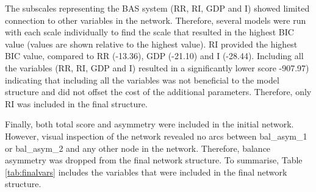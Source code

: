 \documentclass[man,floatsintext]{apa6}
\begin{document}
The subscales representing the BAS system (RR, RI, GDP and I) showed limited connection to other variables in the network.
Therefore, several models were run with each scale individually to find the scale that resulted in the highest BIC value (values are shown relative to the highest value).
RI provided the highest BIC value, compared to RR (-13.36), GDP (-21.10) and I (-28.44).
Including all the variables (RR, RI, GDP and I) resulted in a significantly lower score -907.97) indicating that including all the variables was not beneficial to the model structure and did not offset the cost of the additional parameters. Therefore, only RI was included in the final structure.

Finally, both total score and asymmetry were included in the initial network. However, visual inspection of the network revealed no arcs between bal\_asym\_1 or bal\_asym\_2 and any other node in the network.
Therefore, balance asymmetry was dropped from the final network structure.
To summarise, Table \ref{tab:finalvars} includes the variables that were included in the final network structure.
\end{document}

